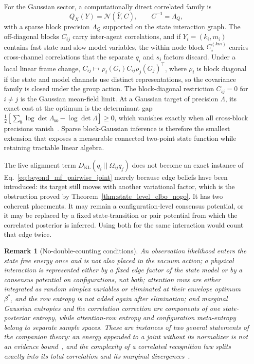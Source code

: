 \documentclass[11pt]{article}
\newtheorem{remark}{Remark}
\begin{document}
For the Gaussian sector, a computationally direct correlated family is
\begin{equation}
Q_X(Y)=\mathcal{N}(\bar{Y},C),
\qquad
C^{-1}=\Lambda_Q,
\label{eq:beyond_mf_block_gaussian}
\end{equation}
with a sparse block precision $\Lambda_Q$ supported on the state interaction graph. The off-diagonal blocks $C_{ij}$ carry inter-agent correlations, and if $Y_i=(k_i,m_i)$ contains fast state and slow model variables, the within-node block $C_i^{(km)}$ carries cross-channel correlations that the separate $q_i$ and $s_i$ factors discard. Under a local linear frame change, $C_{ij}\mapsto \rho_i(G_i)C_{ij}\rho_j(G_j)^\top$, where $\rho_i$ is block diagonal if the state and model channels use distinct representations, so the covariance family is closed under the group action. The block-diagonal restriction $C_{ij}=0$ for $i\ne j$ is the Gaussian mean-field limit. At a Gaussian target of precision $\Lambda$, its exact cost at the optimum is the determinant gap $\frac12[\sum_b\log\det\Lambda_{bb}-\log\det\Lambda]\ge0$, which vanishes exactly when all cross-block precisions vanish~\cite[Ch.~G4]{DennisGaugeVFESuppG2026}. Sparse block-Gaussian inference is therefore the smallest extension that exposes a measurable connected two-point state function while retaining tractable linear algebra.

The live alignment term $D_{\mathrm{KL}}(q_i\|\Omega_{ij}q_j)$ does not become an exact instance of Eq.~\eqref{eq:beyond_mf_pairwise_joint} merely because edge beliefs have been introduced: its target still moves with another variational factor, which is the obstruction proved by Theorem~\ref{thm:state_level_elbo_nogo}. It has two coherent placements. It may remain a configuration-level consensus potential, or it may be replaced by a fixed state-transition or pair potential from which the correlated posterior is inferred. Using both for the same interaction would count that edge twice.

\begin{remark}[No-double-counting conditions]
\label{rem:beyond_mf_no_double_counting}
An observation likelihood enters the state free energy once and is not also placed in the vacuum action; a physical interaction is represented either by a fixed edge factor of the state model or by a consensus potential on configurations, not both; attention rows are either integrated as random simplex variables or eliminated at their envelope optimum $\beta^*$, and the row entropy is not added again after elimination; and marginal Gaussian entropies and the correlation correction are components of one state-posterior entropy, while attention-row entropy and configuration meta-entropy belong to separate sample spaces. These are instances of two general statements of the companion theory: an energy appended to a joint without its normalizer is not an evidence bound~\cite[Ch.~4]{DennisGaugeVFE2026}, and the complexity of a correlated recognition law splits exactly into its total correlation and its marginal divergences~\cite[Ch.~5]{DennisGaugeVFE2026}.
\end{remark}
\end{document}
